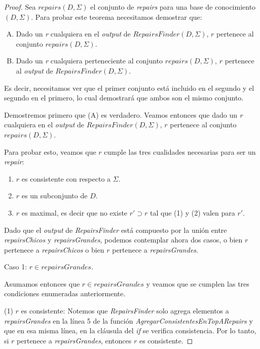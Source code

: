 \documentclass[11pt,a4paper,twoside]{tesis}
\begin{document}
\begin{proof}
Sea $repairs(D, \Sigma)$ el conjunto de \textit{repairs} para una base de conocimiento $(D, \Sigma)$. Para probar este teorema necesitamos demostrar que:
 
\begin{enumerate}[(A)] %
\item Dado un \textit{r} cualquiera en el \textit{output} de $RepairsFinder(D, \Sigma)$, $r$ pertenece al conjunto $repairs(D, \Sigma)$.
\item Dado un \textit{r} cualquiera perteneciente al conjunto $repairs(D, \Sigma)$, $r$ pertenece al \textit{output} de $RepairsFinder(D, \Sigma)$.
\end{enumerate}

Es decir, necesitamos ver que el primer conjunto está incluido en el segundo y el segundo en el primero, lo cual demostrará que ambos son el mismo conjunto.

Demostremos primero que (A) es verdadero. Veamos entonces que dado un \textit{r} cualquiera en el \textit{output} de $RepairsFinder(D, \Sigma)$, $r$ pertenece al conjunto $repairs(D, \Sigma)$.

Para probar esto, veamos que $r$ cumple las tres cualidades necesarias para ser un \textit{repair}:

\begin{enumerate}[(1)]
    \item $r$ es consistente con respecto a $\Sigma$.
    \item $r$ es un subconjunto de $D$.
    \item $r$ es maximal, es decir que no existe $r\prime \supset r$ tal que (1) y (2) valen para $r\prime$.
\end{enumerate}

Dado que el \textit{output} de \textit{RepairsFinder} está compuesto por la unión entre \textit{repairsChicos} y \textit{repairsGrandes}, podemos contemplar ahora dos casos, o bien $r$ pertenece a \textit{repairsChicos} o bien $r$ pertenece a \textit{repairsGrandes}.

\begin{center}
Caso 1: $r \in repairsGrandes$.
\end{center}

Asumamos entonces que $r \in repairsGrandes$ y veamos que se cumplen las tres condiciones enumeradas anteriormente.

(1) $r$ es consistente: Notemos que \textit{RepairsFinder} solo agrega elementos a \textit{repairsGrandes} en la línea 5 de la función \textit{AgregarConsistentesEnTopARepairs} y que en esa misma línea, en la cláusula del \textit{if} se verifica consistencia. Por lo tanto,  si $r$ pertenece a \textit{repairsGrandes}, entonces $r$ es consistente.


\end{proof}
\end{document}
